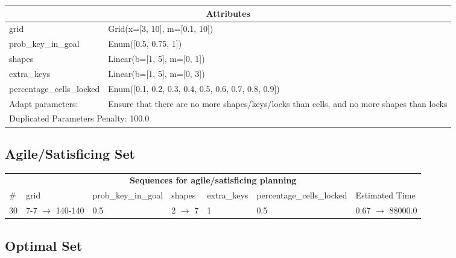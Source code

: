 \documentclass{article}
\begin{document}
                    \begin{center}
                    \begin{tabular}{p{}p{}}
                    \multicolumn{2}{c}{\bf \large Attributes}\\\midrule
                    grid & Grid(x=[3, 10], m=[0.1, 10])\\
prob\_key\_in\_goal & Enum([0.5, 0.75, 1])\\
shapes & Linear(b=[1, 5], m=[0, 1])\\
extra\_keys & Linear(b=[1, 5], m=[0, 3])\\
percentage\_cells\_locked & Enum([0.1, 0.2, 0.3, 0.4, 0.5, 0.6, 0.7, 0.8, 0.9])
                    
                    \\\midrule
                    Adapt parameters: & Ensure that there are no more shapes/keys/locks than cells, and no more shapes than locks  
                
                     \\\midrule
                    \multicolumn{2}{l}{Duplicated Parameters Penalty: 100.0}
                    \end{tabular}
                    \end{center}
                
                         \subsection*{Agile/Satisficing Set}

                        \begin{center}
                        \begin{tabular}{l|l|l|l|l|l|l}
                        \multicolumn{7}{c}{\bf \large Sequences for agile/satisficing planning}\\
                        \# & grid & prob\_key\_in\_goal & shapes & extra\_keys & percentage\_cells\_locked & Estimated Time\\\midrule
                        30&7-7 $\rightarrow$ 140-140&0.5&2 $\rightarrow$ 7&1&0.5&0.67 $\rightarrow$ 88000.0
                        \end{tabular}
                        \end{center}
                    
                            \subsection*{Optimal Set}
\end{document}
